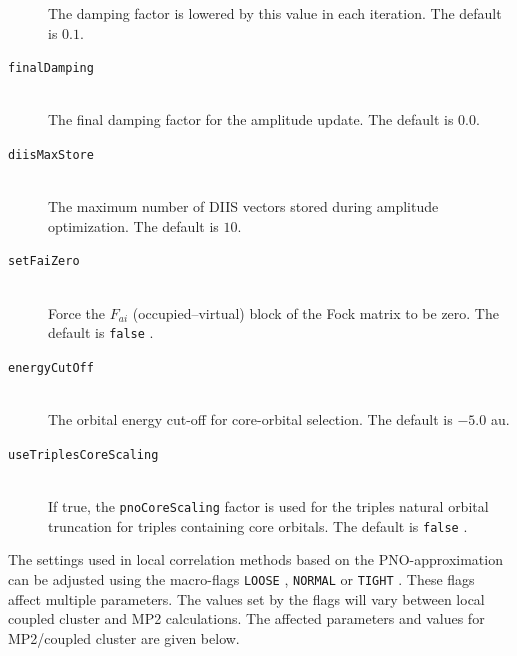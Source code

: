 \documentclass[bibliography=totocnumbered,a4paper,10pt,oneside]{scrbook}
\newcommand{\ttt}[1]{%
  \begingroup\setlength{\fboxsep}{1pt}%
  \colorbox{serenity-green!30}{\texttt{\hspace*{2pt}\vphantom{(g}#1\hspace*{2pt}}}%
  \endgroup
}
\begin{document}
\begin{description}
    The damping factor is lowered by this value in each iteration. The default is $0.1$.
    \item [\texttt{finalDamping}]\hfill \\
    The final damping factor for the amplitude update. The default is $0.0$.
    \item [\texttt{diisMaxStore}]\hfill \\
    The maximum number of DIIS vectors stored during amplitude optimization. The default is $10$.
    \item [\texttt{setFaiZero}]\hfill \\
    Force the $F_{ai}$ (occupied--virtual) block of the Fock matrix to be zero. The default is \ttt{false}.
    \item [\texttt{energyCutOff}]\hfill \\
    The orbital energy cut-off for core-orbital selection. The default is $-5.0$ au.
    \item [\texttt{useTriplesCoreScaling}]\hfill \\
    If true, the \texttt{pnoCoreScaling} factor is used for the triples natural orbital truncation for
    triples containing core orbitals. The default is \ttt{false}.
 \end{description}

The settings used in local correlation methods based on the PNO-approximation can
be adjusted using the macro-flags \ttt{LOOSE}, \ttt{NORMAL} or \ttt{TIGHT}.
These flags affect multiple parameters. The values set by the flags will vary between
local coupled cluster and MP2 calculations. The affected parameters and values for
MP2/coupled cluster are given below.
\end{document}
